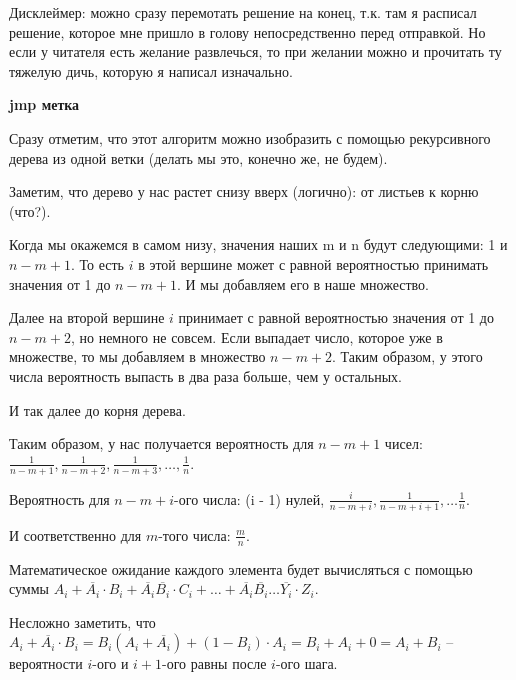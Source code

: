 \documentclass[12pt]{extreport}
\theoremstyle{definiton}
\theoremstyle{definition}
\theoremstyle{definition}
\let\es\varnothing
\def\prend{
	\bigskip
}
\begin{document}
 \begin{algorithm}[H]
   \Fn{\RandomSample{$m, n$}}{
       \uIf{$m == 0$}{
        	\KwRet $\es$
		}\Else{
			   $S = $\RandomSample{$m-1, n-1$}\;
			   $i = $\Random{$1,n$}\;
		       \uIf{$i \in S$}{
		        	\KwRet $S\cup \{n\}$
				}\Else{
					\KwRet $S\cup \{i\}$
				}
	   }		
	} 
   
\end{algorithm}

\prend

	Дисклеймер: можно сразу перемотать решение на конец, т.к. там я расписал решение, которое мне пришло в голову непосредственно перед отправкой.
	Но если у читателя есть желание развлечься, то при желании можно и прочитать ту тяжелую дичь, которую я написал изначально.

	\textbf{jmp метка}

	Сразу отметим, что этот алгоритм можно изобразить с помощью рекурсивного дерева из одной ветки (делать мы это, конечно же, не будем).

	Заметим, что дерево у нас растет снизу вверх (логично): от листьев к корню (что?).

	Когда мы окажемся в самом низу, значения наших m и n будут следующими: 1 и $n - m + 1$.
	То есть $i$ в этой вершине может с равной вероятностью принимать значения от 1 до $n - m + 1$. И мы добавляем его в наше множество.

	Далее на второй вершине $i$ принимает с равной вероятностью значения от 1 до $n - m + 2$, но немного не совсем. Если выпадает число, которое уже в множестве, то мы добавляем в множество $n - m + 2$. Таким образом, у этого числа вероятность выпасть в два раза больше, чем у остальных.

	И так далее до корня дерева.

	Таким образом, у нас получается вероятность для $n - m + 1$ чисел: $\frac{1}{n - m + 1}, \frac{1}{n - m + 2}, \frac{1}{n - m + 3}, \dots, \frac{1}{n}$.

	Вероятность для $n - m + i$-ого числа: (i - 1) нулей, $\frac{i}{n - m + i}, \frac{1}{n - m + i + 1}, \dots \frac{1}{n}$.

	И соответственно для $m$-того числа: $\frac{m}{n}$.

	Математическое ожидание каждого элемента будет вычисляться с помощью суммы $A_i + \overline{A_i} \cdot B_i + \overline{A_i} \overline{B_i} \cdot C_i + \dots + \overline{A_i} \overline{B_i} \dots \overline{Y_i} \cdot Z_i$.

	Несложно заметить, что $A_i + \overline{A_i} \cdot B_i = B_i (A_i + \overline{A_i}) + (1 - B_i) \cdot A_i = B_i + A_i + 0 = A_i + B_i$ -- вероятности $i$-ого и $i+1$-ого равны после $i$-ого шага.
\end{document}
